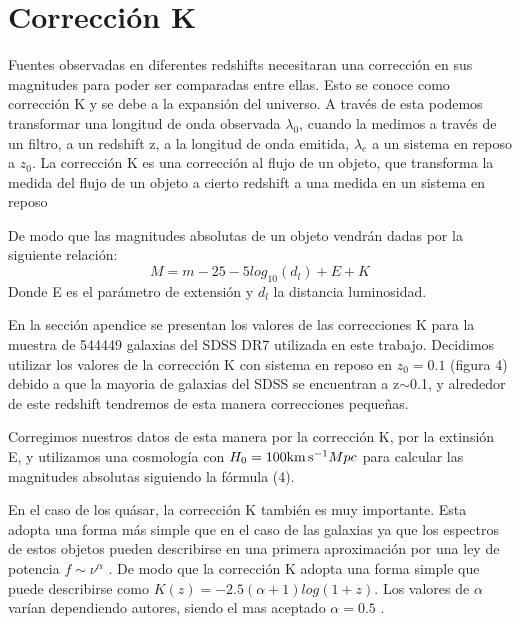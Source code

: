 \documentclass[a4paper,10pt]{article}
\newcommand{\kms}{{\rm km\,s^{-1}}}
\begin{document}
\section{Correcci\'on K}
Fuentes observadas en diferentes redshifts necesitaran una correcci\'on en sus magnitudes para poder ser comparadas entre ellas. Esto se conoce como correcci\'on K y se debe a la expansi\'on del universo. A trav\'es de esta podemos transformar una longitud de onda observada $\lambda_{0}$, cuando la medimos a trav\'es de un filtro, a un redshift z, a la longitud de onda emitida, $\lambda_{e}$ a un sistema en reposo a $z_{0}$. 
La correcci\'on K es una correcci\'on al flujo de un objeto, que transforma la medida del flujo de un objeto a cierto redshift a una medida en un sistema en reposo \citep{Taverna}

De modo que las magnitudes absolutas de un objeto vendr\'an dadas por la siguiente relaci\'on: 
\begin{equation}
M = m - 25 - 5log_{10}(d_{l}) + E + K 
\end{equation}
Donde E es el par\'ametro de extensi\'on y $d_{l}$ la distancia luminosidad.

En la secci\'on apendice se presentan los valores de las correcciones K para la muestra de 544449 galaxias del SDSS DR7 \citep{SDSS} \citep{Abazajian2009} utilizada en este trabajo. Decidimos utilizar los valores de la correcci\'on K con sistema en reposo en $z_{0}=0.1$ (figura 4) debido a que la mayoria de galaxias del SDSS se encuentran a z$\sim$0.1, y alrededor de este redshift tendremos de esta manera correcciones pequeñas. 



Corregimos nuestros datos de esta manera por la correcci\'on K, por la extinsi\'on E, y utilizamos una cosmolog\'ia con $H_{0}=100\kms Mpc$ para calcular las magnitudes absolutas siguiendo la f\'ormula (4).

En el caso de los qu\'asar, la correcci\'on K tambi\'en es muy importante. Esta adopta una forma m\'as simple que en el caso de las galaxias ya que los espectros de estos objetos pueden describirse en una primera aproximaci\'on por una ley de potencia $f\sim\nu^{\alpha}$  \citep{Richstone1980}. De modo que la correcci\'on K adopta una forma simple que puede describirse como $K(z)=-2.5(\alpha+1)log(1+z)$. Los valores de $\alpha$ var\'ian dependiendo autores, siendo el mas aceptado $\alpha=0.5$ \citep{Wisotzki2000}.
\end{document}
